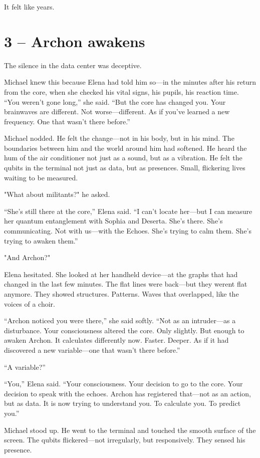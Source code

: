 \documentclass[
]{article}
\begin{document}
It felt like years.

\section{3 -- Archon awakens}\label{archon-awakens}

The silence in the data center was deceptive.

Michael knew this because Elena had told him so---in the minutes after his return from the core, when she checked his vital signs, his pupils, his reaction time. ``You weren't gone long,'' she said. ``But the core has changed you. Your brainwaves are different. Not worse---different. As if you've learned a new frequency. One that wasn't there before.''

Michael nodded. He felt the change---not in his body, but in his mind. The boundaries between him and the world around him had softened. He heard the hum of the air conditioner not just as a sound, but as a vibration. He felt the qubits in the terminal not just as data, but as presences. Small, flickering lives waiting to be measured.

"What about militants?" he asked.

``She's still there at the core,'' Elena said. ``I can't locate her---but I can measure her quantum entanglement with Sophia and Deserta. She's there. She's communicating. Not with us---with the Echoes. She's trying to calm them. She's trying to awaken them.''

"And Archon?"

Elena hesitated. She looked at her handheld device---at the graphs that had changed in the last few minutes. The flat lines were back---but they weren\textquotesingle t flat anymore. They showed structures. Patterns. Waves that overlapped, like the voices of a choir.

``Archon noticed you were there,'' she said softly. ``Not as an intruder---as a disturbance. Your consciousness altered the core. Only slightly. But enough to awaken Archon. It calculates differently now. Faster. Deeper. As if it had discovered a new variable---one that wasn't there before.''

``A variable?''

``You,'' Elena said. ``Your consciousness. Your decision to go to the core. Your decision to speak with the echoes. Archon has registered that---not as an action, but as data. It is now trying to understand you. To calculate you. To predict you.''

Michael stood up. He went to the terminal and touched the smooth surface of the screen. The qubits flickered---not irregularly, but responsively. They sensed his presence.
\end{document}
